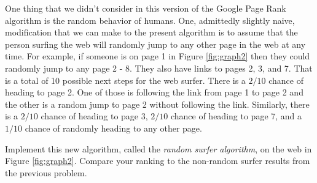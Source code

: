 \begin{problem}
    One thing that we didn't consider in this version of the Google Page Rank algorithm is
    the random behavior of humans.  One, admittedly slightly naive, modification that we
    can make to the present algorithm is to assume that the person surfing the web will
    randomly jump to any other page in the web at any time.  For example, if someone is on
    page 1 in Figure \ref{fig:graph2} then they could randomly jump to any page 2 - 8.
    They also have links to pages 2, 3, and 7.  That is a total of 10 possible next steps
    for the web surfer.  There is a $2/10$ chance of heading to page 2.  One of those is
    following the link from page 1 to page 2 and the other is a random jump to page 2
    without following the link.  Similarly, there is a $2/10$ chance of
    heading to page 3, $2/10$ chance of heading to page 7, and a $1/10$ chance of randomly
    heading to any other page.

    Implement this new algorithm, called the {\it random surfer algorithm}, on the web in
    Figure \ref{fig:graph2}.  Compare your ranking to the non-random surfer results from
    the previous problem.
\end{problem}



